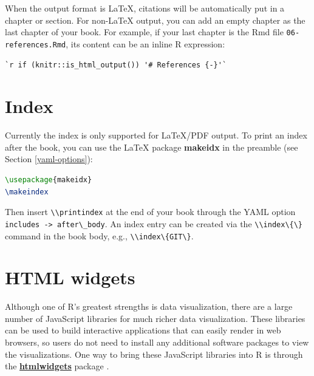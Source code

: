 \documentclass[doctor,openright,twoside]{sjtuthesis}
\newcommand{\passthrough}[1]{#1}
\theoremstyle{plain}
\theoremstyle{definition}
\theoremstyle{remark}
\theoremstyle{ocrenumbox}
\theoremstyle{plain}
\begin{document}
When the output format is LaTeX, citations will be automatically put in
a chapter or section. For non-LaTeX output, you can add an empty chapter
as the last chapter of your book. For example, if your last chapter is
the Rmd file \passthrough{\lstinline!06-references.Rmd!}, its content
can be an inline R expression:

\begin{lstlisting}
`r if (knitr::is_html_output()) '# References {-}'`
\end{lstlisting}

\hypertarget{latex-index}{%
\section{Index}\label{latex-index}}

Currently the index is only supported for LaTeX/PDF output.
To print an index after the book, you can use the LaTeX package
\textbf{makeidx} in the preamble (see Section \ref{yaml-options}):

\begin{lstlisting}[language=TeX]
\usepackage{makeidx}
\makeindex
\end{lstlisting}

Then insert \passthrough{\lstinline!\\printindex!} at the end of your
book through the YAML option
\passthrough{\lstinline!includes -> after\_body!}. An index entry can be
created via the \passthrough{\lstinline!\\index\{\}!} command in the
book body, e.g., \passthrough{\lstinline!\\index\{GIT\}!}.

\hypertarget{html-widgets}{%
\section{HTML widgets}\label{html-widgets}}

Although one of R's greatest strengths is data visualization, there are
a large number of JavaScript libraries for much richer data
visualization. These libraries can be used to build interactive
applications that can easily render in web browsers, so users do not
need to install any additional software packages to view the
visualizations. One way to bring these JavaScript libraries into R is
through the \href{http://htmlwidgets.org}{\textbf{htmlwidgets}} package
\autocite{R-htmlwidgets}.
\end{document}

